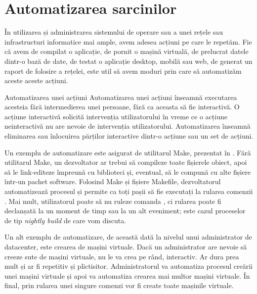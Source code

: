 \chapter{Automatizarea sarcinilor}
\label{chapter:auto}

În utilizarea și administrarea sistemului de operare sau a unei rețele sau infrastructuri informatice mai ample, avem adesea acțiuni pe care le repetăm.
Fie că avem de compilat o aplicație, de pornit o mașină virtuală, de prelucrat datele dintr-o bază de date, de testat o aplicație desktop, mobilă sau web, de generat un raport de folosire a rețelei, este util să avem moduri prin care să
automatizăm aceste aceste acțiuni.

\begin{definition}{Automatizarea unei acțiuni}
Automatizarea unei acțiuni înseamnă executarea acesteia fără intermedierea unei persoane, fără ca aceasta să fie interactivă.
O acțiune interactivă solicită intervenția utilizatorului în vreme ce o acțiune neinteractivă nu are nevoie de intervenția utilizatorului.
Automatizarea înseamnă eliminarea sau înlocuirea părților interactive dintr-o acțiune sau un set de acțiuni.
\end{definition}

Un exemplu de automatizare este asigurat de utilitarul Make, prezentat în .
Fără utilitarul Make, un dezvoltator ar trebui să compileze toate fișierele obiect, apoi să le link-editeze împreună cu biblioteci și, eventual, să le compună cu alte fișiere într-un pachet software.
Folosind Make și fișiere Makefile, dezvoltatorul automatizează procesul și permite ca toți pașii să fie executați la rularea comenzii .
Mai mult, utilizatorul poate să nu ruleze comanda , ci rularea poate fi declanșată la un moment de timp sau la un alt eveniment; este cazul proceselor de tip \textit{nightly build} de care vom discuta.

Un alt exemplu de automatizare, de această dată la nivelul unui administrator de datacenter, este crearea de mașini virtuale.
Dacă un administrator are nevoie să creeze sute de mașini virtuale, nu le va crea pe rând, interactiv.
Ar dura prea mult și ar fi repetitiv și plictisitor.
Administratorul va automatiza procesul creării unei mașini virtuale și apoi va automatiza crearea mai multor mașini virtuale.
În final, prin rularea unei singure comenzi vor fi create toate mașinile virtuale.

